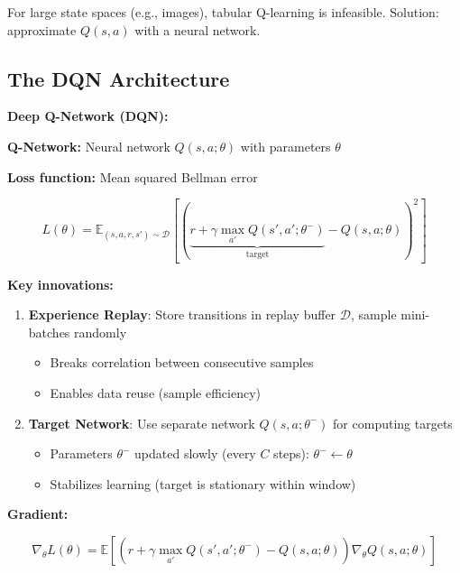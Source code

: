 For large state spaces (e.g., images), tabular Q-learning is infeasible. Solution: approximate $Q(s, a)$ with a neural network.

\subsection{The DQN Architecture}

\begin{seanbox}{5.7}
\textbf{Deep Q-Network (DQN):}

\textbf{Q-Network:} Neural network $Q(s, a; \theta)$ with parameters $\theta$

\textbf{Loss function:} Mean squared Bellman error

\begin{equation}
    L(\theta) = \mathbb{E}_{(s,a,r,s') \sim \mathcal{D}} \left[ \left( \underbrace{r + \gamma \max_{a'} Q(s', a'; \theta^-)}_{\text{target}} - Q(s, a; \theta) \right)^2 \right]
\end{equation}

\textbf{Key innovations:}

\begin{enumerate}
    \item \textbf{Experience Replay}: Store transitions in replay buffer $\mathcal{D}$, sample mini-batches randomly
    \begin{itemize}
        \item Breaks correlation between consecutive samples
        \item Enables data reuse (sample efficiency)
    \end{itemize}
    
    \item \textbf{Target Network}: Use separate network $Q(s, a; \theta^-)$ for computing targets
    \begin{itemize}
        \item Parameters $\theta^-$ updated slowly (every $C$ steps): $\theta^- \leftarrow \theta$
        \item Stabilizes learning (target is stationary within window)
    \end{itemize}
\end{enumerate}

\textbf{Gradient:}

\begin{equation}
    \nabla_\theta L(\theta) = \mathbb{E} \left[ \left( r + \gamma \max_{a'} Q(s', a'; \theta^-) - Q(s, a; \theta) \right) \nabla_\theta Q(s, a; \theta) \right]
\end{equation}


\end{seanbox}

